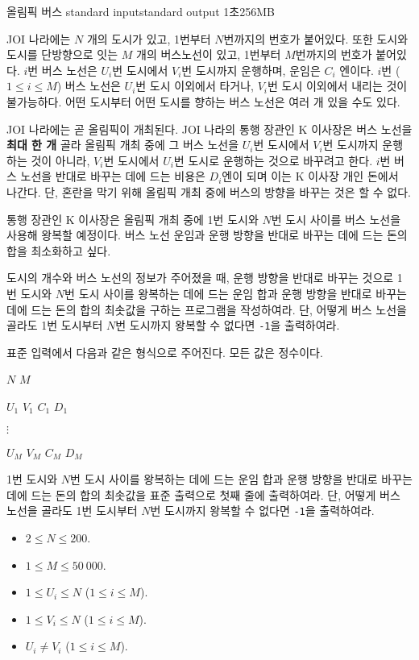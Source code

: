 \begin{problem}{올림픽 버스}
	{standard input}{standard output}
	{1초}{256MB}{}
	
	JOI 나라에는 $N$ 개의 도시가 있고, 1번부터 $N$번까지의 번호가 붙어있다. 또한 도시와 도시를 단방향으로 잇는 $M$ 개의 버스노선이 있고, 1번부터 $M$번까지의 번호가 붙어있다. $i$번 버스 노선은 $U_i$번 도시에서 $V_i$번 도시까지 운행하며, 운임은 $C_i$ 엔이다. $i$번 ($1 \le i \le M$) 버스 노선은 $U_i$번 도시 이외에서 타거나, $V_i$번 도시 이외에서 내리는 것이 불가능하다. 어떤 도시부터 어떤 도시를 향하는 버스 노선은 여러 개 있을 수도 있다.
	
	JOI 나라에는 곧 올림픽이 개최된다. JOI 나라의 통행 장관인 K 이사장은 버스 노선을 \textbf{최대 한 개} 골라 올림픽 개최 중에 그 버스 노선을 $U_i$번 도시에서 $V_i$번 도시까지 운행하는 것이 아니라, $V_i$번 도시에서 $U_i$번 도시로 운행하는 것으로 바꾸려고 한다. $i$번 버스 노선을 반대로 바꾸는 데에 드는 비용은 $D_i$엔이 되며 이는 K 이사장 개인 돈에서 나간다. 단, 혼란을 막기 위해 올림픽 개최 중에 버스의 방향을 바꾸는 것은 할 수 없다.
	
	통행 장관인 K 이사장은 올림픽 개최 중에 1번 도시와 $N$번 도시 사이를 버스 노선을 사용해 왕복할 예정이다. 버스 노선 운임과 운행 방향을 반대로 바꾸는 데에 드는 돈의 합을 최소화하고 싶다.
	
	도시의 개수와 버스 노선의 정보가 주어졌을 때, 운행 방향을 반대로 바꾸는 것으로 1번 도시와 $N$번 도시 사이를 왕복하는 데에 드는 운임 합과 운행 방향을 반대로 바꾸는 데에 드는 돈의 합의 최솟값을 구하는 프로그램을 작성하여라. 단, 어떻게 버스 노선을 골라도 1번 도시부터 $N$번 도시까지 왕복할 수 없다면 \texttt{-1}을 출력하여라.
	
	
	\InputFile
	
	표준 입력에서 다음과 같은 형식으로 주어진다. 모든 값은 정수이다.

	$N$ $M$
	
	$U_1$ $V_1$ $C_1$ $D_1$
	
	$\vdots$
	
	$U_M$ $V_M$ $C_M$ $D_M$
	
	\OutputFile
	
	1번 도시와 $N$번 도시 사이를 왕복하는 데에 드는 운임 합과 운행 방향을 반대로 바꾸는 데에 드는 돈의 합의 최솟값을 표준 출력으로 첫째 줄에 출력하여라. 단, 어떻게 버스 노선을 골라도 1번 도시부터 $N$번 도시까지 왕복할 수 없다면 \texttt{-1}을 출력하여라.
	
	
	\Constraints
	
	\begin{itemize}
	\item $2 \le N \le 200$.
	\item $1 \le M \le 50\ 000$.
	\item $1 \le U_i \le N$ ($1 \le i \le M$).
	\item $1 \le V_i \le N$ ($1 \le i \le M$).
	\item $U_i \ne V_i$ ($1 \le i \le M$).


\end{itemize}
\end{problem}
